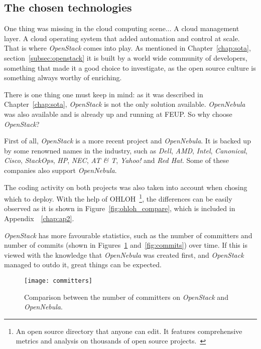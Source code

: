 \subsection{The chosen technologies}\label{subsec:tech}

One thing was missing in the cloud computing scene... A cloud management layer. A cloud operating system that added automation and control at scale. That is where \textit{OpenStack} comes into play. As mentioned in Chapter~\ref{chap:sota}, section~\ref{subsec:openstack} it is built by a world wide community of developers, something that made it a good choice to investigate, as the open source culture is something always worthy of enriching.~\cite{stackgithub}

There is one thing one must keep in mind: as it was described in Chapter~\ref{chap:sota}, \textit{OpenStack} is not the only solution available. \textit{OpenNebula} was also available and is already up and running at FEUP. So why choose \textit{OpenStack}?

First of all, \textit{OpenStack} is a more recent project and \textit{OpenNebula}. It is backed up by some renowned names in the industry, such as \textit{Dell}, \textit{AMD}, \textit{Intel}, \textit{Canonical}, \textit{Cisco}, \textit{StackOps}, \textit{HP}, \textit{NEC}, \textit{AT \& T}, \textit{Yahoo!} and \textit{Red Hat}. Some of these companies also support \textit{OpenNebula}.

The coding activity on both projects was also taken into account when chosing which to deploy. With the help of OHLOH~\footnote{An open source directory that anyone can edit. It features comprehensive metrics and analysis on thousands of open source projects.~\cite{ohloh}}, the differences can be easily observed as it is shown in Figure~\ref{fig:ohloh_compare}, which is included in Appendix~~\ref{chap:ap2}.

\textit{OpenStack} has more favourable statistics, such as the number of committers and number of commits (shown in Figures~\ref{fig:committers} and~\ref{fig:commits}) over time. If this is viewed with the knowledge that \textit{OpenNebula} was created first, and \textit{OpenStack} managed to outdo it, great things can be expected.

\begin{figure}[h]
  \begin{center} 
    \leavevmode 
    \texttt{[image: committers]}
    \caption{Comparison between the number of committers on \textit{OpenStack} and \textit{OpenNebula}.~\cite{ohloh}} 
    \label{fig:committers} 
  \end{center}
\end{figure}

